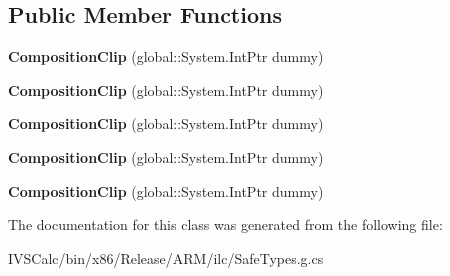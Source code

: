 \subsection*{Public Member Functions}
\begin{DoxyCompactItemize}
\item 
\mbox{\label{class_windows_1_1_u_i_1_1_composition_1_1_composition_clip_a4d94b07c2b3a464d20defb91538035c9}} 
{\bfseries Composition\+Clip} (global\+::\+System.\+Int\+Ptr dummy)
\item 
\mbox{\label{class_windows_1_1_u_i_1_1_composition_1_1_composition_clip_a4d94b07c2b3a464d20defb91538035c9}} 
{\bfseries Composition\+Clip} (global\+::\+System.\+Int\+Ptr dummy)
\item 
\mbox{\label{class_windows_1_1_u_i_1_1_composition_1_1_composition_clip_a4d94b07c2b3a464d20defb91538035c9}} 
{\bfseries Composition\+Clip} (global\+::\+System.\+Int\+Ptr dummy)
\item 
\mbox{\label{class_windows_1_1_u_i_1_1_composition_1_1_composition_clip_a4d94b07c2b3a464d20defb91538035c9}} 
{\bfseries Composition\+Clip} (global\+::\+System.\+Int\+Ptr dummy)
\item 
\mbox{\label{class_windows_1_1_u_i_1_1_composition_1_1_composition_clip_a4d94b07c2b3a464d20defb91538035c9}} 
{\bfseries Composition\+Clip} (global\+::\+System.\+Int\+Ptr dummy)
\end{DoxyCompactItemize}


The documentation for this class was generated from the following file\+:\begin{DoxyCompactItemize}
\item 
I\+V\+S\+Calc/bin/x86/\+Release/\+A\+R\+M/ilc/Safe\+Types.\+g.\+cs\end{DoxyCompactItemize}
